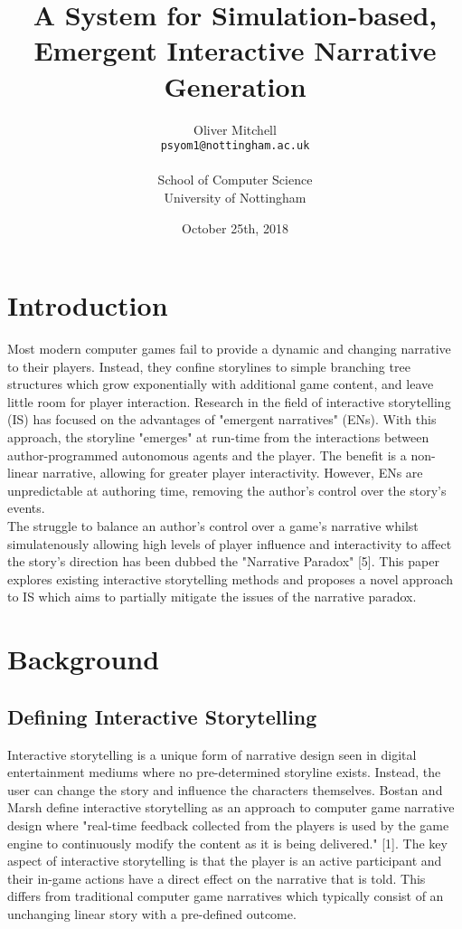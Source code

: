 \documentclass{article}
\title{A System for Simulation-based, Emergent Interactive Narrative Generation}
\author{
  Oliver Mitchell\\
  \texttt{psyom1@nottingham.ac.uk}\\\\
  \textnormal{School of Computer Science}\\
  \textnormal{University of Nottingham}
}
\date{October 25th, 2018}
\begin{document}
\maketitle
 
\tableofcontents
\newpage

\section{Introduction}

Most modern computer games fail to provide a dynamic and changing narrative to their players. Instead, they confine storylines to simple branching tree structures which grow exponentially with additional game content, and leave little room for player interaction. Research in the field of interactive storytelling (IS) has focused on the advantages of "emergent narratives" (ENs). With this approach, the storyline "emerges" at run-time from the interactions between author-programmed autonomous agents and the player. The benefit is a non-linear narrative, allowing for greater player interactivity. However, ENs are unpredictable at authoring time, removing the author's control over the story's events.\\

\noindent The struggle to balance an author's control over a game's narrative whilst simulatenously allowing high levels of player influence and interactivity to affect the story's direction has been dubbed the "Narrative Paradox" [5]. This paper explores existing interactive storytelling methods and proposes a novel approach to IS which aims to partially mitigate the issues of the narrative paradox.

\section{Background}

\subsection{Defining Interactive Storytelling}

Interactive storytelling is a unique form of narrative design seen in digital entertainment mediums where no pre-determined storyline exists. Instead, the user can change the story and influence the characters themselves. Bostan and Marsh define interactive storytelling as an approach to computer game narrative design where "real-time feedback collected from the players is used by the game engine to continuously modify the content as it is being delivered." [1]. The key aspect of interactive storytelling is that the player is an active participant and their in-game actions have a direct effect on the narrative that is told. This differs from traditional computer game narratives which typically consist of an unchanging linear story with a pre-defined outcome.
\end{document}
